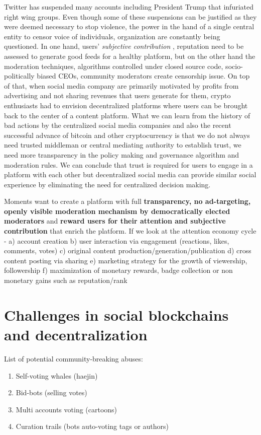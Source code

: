 \documentclass[a4paper]{article}
\begin{document}
Twitter has suspended many accounts including President Trump that infuriated right wing groups. Even though some of these suspensions can be justified as they were deemed necessary to stop violence, the power in the hand of a single central entity to censor voice of individuals, organization are constantly being questioned. In one hand, users' \textit{subjective contribution }, reputation need to be assessed to generate good feeds for a healthy platform, but on the other hand the moderation techniques, algorithms controlled under closed source code, socio-politically biased CEOs, community moderators create censorship issue. On top of that, when social media company are primarily motivated by profits from advertising and not sharing revenues that users generate for them, crypto enthusiasts had to envision decentralized platforms where users can be brought back to the center of a content platform. What we can learn from the history of bad actions by the centralized social media companies and also the recent successful advance of bitcoin and other cryptocurrency is that we do not always need trusted middleman or central mediating authority to establish trust, we need more transparency in the policy making and governance algorithm and moderation rules. We can conclude that trust is required for users to engage in a platform with each other but decentralized social media can provide similar social experience by eliminating the need for centralized decision making.
\par Moments want to create a platform with full \textbf{transparency, no ad-targeting, openly visible moderation mechanism by democratically elected moderators} and \textbf{reward users for their attention and subjective contribution } that enrich the platform. If we look at the attention economy cycle - a) account creation b) user interaction via engagement (reactions, likes, comments, votes) c) original content production/generation/publication d) cross content posting via sharing e) marketing strategy for the growth of viewership, followership f) maximization of monetary rewards, badge collection or non monetary gains such as reputation/rank  

\section{Challenges in social blockchains and decentralization}
 List of potential community-breaking abuses:
 \begin{enumerate}
     \item Self-voting whales (haejin)
     \item Bid-bots (selling votes)
     \item Multi accounts voting (cartoons)
     \item Curation trails (bots auto-voting tags or authors)
 \end{enumerate}
\end{document}
